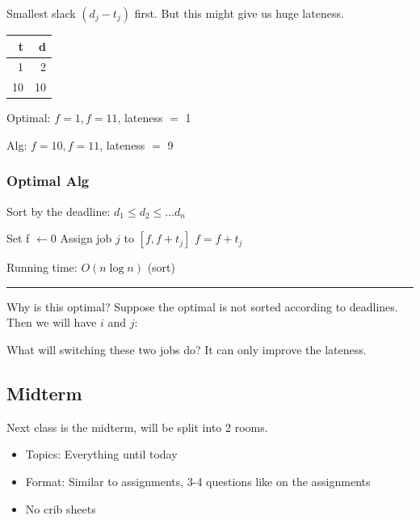 \documentclass[11pt]{article}
\begin{document}
Smallest slack \((d_j-t_j)\) first. But this might give us huge lateness.
\begin{center}
\begin{tabular}{rr}
t & d\\
\hline
1 & 2\\
10 & 10\\
\end{tabular}
\end{center}
Optimal: \(f=1, f=11\), lateness \(=\) 1

Alg: \(f=10, f=11\), lateness \(=\) 9
\subsubsection{Optimal Alg}
\label{sec:org6dfd6ad}
Sort by the deadline: \(d_1 \leq d_2 \leq \ldots d_n\)
\begin{algorithmic}
  \State Set f $\gets 0$
  \State Assign job $j$ to $[f,f+t_j]$
  \State $f=f+t_j$
  \EndFor
\end{algorithmic}
Running time: \(O(n \log n)\) (sort)

\noindent\rule{\textwidth}{0.5pt}
Why is this optimal? Suppose the optimal is not sorted according to deadlines. Then we will have \(i\) and \(j\): 

What will switching these two jobs do? It can only improve the lateness. 
\subsection{Midterm}
\label{sec:org3b927e2}
Next class is the midterm, will be split into 2 rooms.
\begin{itemize}
\item Topics: Everything until today
\item Format: Similar to assignments, 3-4 questions like on the assignments
\item No crib sheets
\end{itemize}
\end{document}
